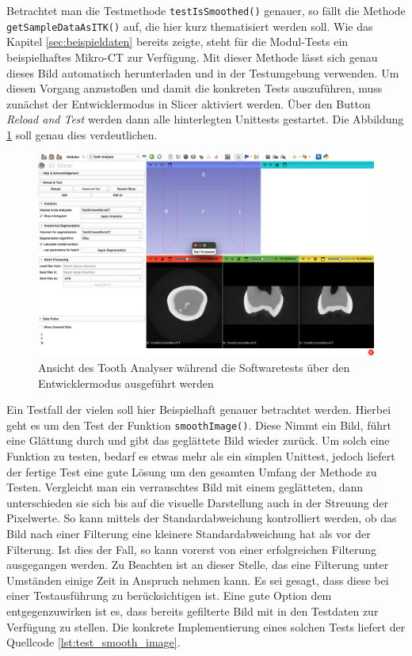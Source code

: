 Betrachtet man die Testmethode \texttt{testIsSmoothed()} genauer, so fällt die
Methode \texttt{getSampleDataAsITK()} auf, die hier kurz thematisiert werden
soll. Wie das Kapitel \ref{sec:beispieldaten} bereits zeigte, steht für die
Modul-Tests ein beispielhaftes Mikro-CT zur Verfügung. Mit dieser Methode lässt sich
genau dieses Bild automatisch herunterladen und in der Testumgebung verwenden.
Um diesen Vorgang anzustoßen und damit die konkreten Tests auszuführen, muss zunächst
der Entwicklermodus in Slicer aktiviert werden. Über den Button \textit{Reload
and Test} werden dann alle hinterlegten Unittests gestartet. Die Abbildung
\ref{fig:tests} soll genau dies verdeutlichen.

\begin{figure}[h]
	\centering
	\includegraphics[width=1\textwidth]{img/toothAnalyser_test.png}
	\caption{Ansicht des Tooth Analyser während die Softwaretests über den
	Entwicklermodus ausgeführt werden}
	\label{fig:tests}
\end{figure}

Ein Testfall der vielen soll hier Beispielhaft genauer betrachtet werden.
Hierbei geht es um den Test der Funktion \texttt{smoothImage()}. Diese Nimmt ein
Bild, führt eine Glättung durch und gibt das geglättete Bild wieder zurück. Um
solch eine Funktion zu testen, bedarf es etwas mehr als ein simplen Unittest,
jedoch liefert der fertige Test eine gute Lösung um den gesamten Umfang der
Methode zu Testen. Vergleicht man ein verrauschtes Bild mit einem geglätteten,
dann unterschieden sie sich bis auf die visuelle Darstellung auch in der
Streuung der Pixelwerte. So kann mittels der Standardabweichung kontrolliert werden,
ob das Bild nach einer Filterung eine kleinere Standardabweichung hat als vor
der Filterung. Ist dies der Fall, so kann vorerst von einer erfolgreichen
Filterung ausgegangen werden. Zu Beachten ist an dieser Stelle, das eine
Filterung unter Umständen einige Zeit in Anspruch nehmen kann. Es sei gesagt,
dass diese bei einer Testausführung zu berücksichtigen ist. Eine gute Option dem
entgegenzuwirken ist es, dass bereits gefilterte Bild mit in den Testdaten zur
Verfügung zu stellen. Die konkrete Implementierung eines solchen Tests liefert der
Quellcode \ref{lst:test_smooth_image}.

